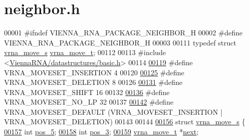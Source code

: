 \hypertarget{neighbor_8h_source}{}\section{neighbor.\+h}
\label{neighbor_8h_source}

\begin{DoxyCode}
00001 \textcolor{preprocessor}{#ifndef VIENNA\_RNA\_PACKAGE\_NEIGHBOR\_H}
00002 \textcolor{preprocessor}{#define VIENNA\_RNA\_PACKAGE\_NEIGHBOR\_H}
00003 
00111 \textcolor{keyword}{typedef} \textcolor{keyword}{struct }\hyperlink{group__neighbors_structvrna__move__s}{vrna\_move\_s} \hyperlink{group__neighbors_structvrna__move__s}{vrna\_move\_t};
00112 
00113 \textcolor{preprocessor}{#include <\hyperlink{datastructures_2basic_8h}{ViennaRNA/datastructures/basic.h}>}
00114 
\hyperlink{group__neighbors_gaf39028db9c70d3be528929182a3f2d5a}{00119} \textcolor{preprocessor}{#define VRNA\_MOVESET\_INSERTION   4}
00120 
\hyperlink{group__neighbors_gac05db9392c6647e3e9a6982096c5b384}{00125} \textcolor{preprocessor}{#define VRNA\_MOVESET\_DELETION    8}
00126 
\hyperlink{group__neighbors_ga68ea27c81de4b74e48b775c04052590b}{00131} \textcolor{preprocessor}{#define VRNA\_MOVESET\_SHIFT       16}
00132 
\hyperlink{group__neighbors_ga258084b251b218fba9398826435a4393}{00136} \textcolor{preprocessor}{#define VRNA\_MOVESET\_NO\_LP       32}
00137 
\hyperlink{group__neighbors_gaa5ffec4dd0d02df320f123e6888154d1}{00142} \textcolor{preprocessor}{#define VRNA\_MOVESET\_DEFAULT     (VRNA\_MOVESET\_INSERTION | VRNA\_MOVESET\_DELETION)}
00143 
00144 
\hyperlink{group__neighbors}{00156} \textcolor{keyword}{struct }\hyperlink{group__neighbors_structvrna__move__s}{vrna\_move\_s} \{
\hyperlink{group__neighbors_a8af908c74786675a456d0f20cc8fcb9b}{00157}   \textcolor{keywordtype}{int} \hyperlink{group__neighbors_a8af908c74786675a456d0f20cc8fcb9b}{pos\_5};  
\hyperlink{group__neighbors_a3849db905a45c4e399991df38705a36b}{00158}   \textcolor{keywordtype}{int} \hyperlink{group__neighbors_a3849db905a45c4e399991df38705a36b}{pos\_3};  
\hyperlink{group__neighbors_a181681bc3aab907d93e340df4777e759}{00159}   \hyperlink{group__neighbors_structvrna__move__s}{vrna\_move\_t} *\hyperlink{group__neighbors_a181681bc3aab907d93e340df4777e759}{next}; 

\end{DoxyCode}
